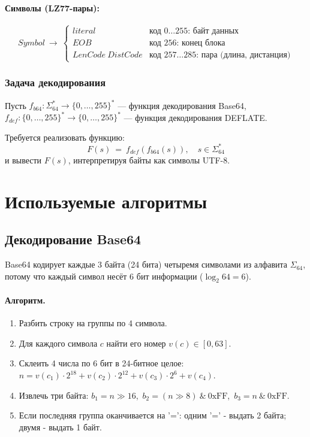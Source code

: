 \documentclass[12pt,a4paper]{article}
\begin{document}
\paragraph{Символы (LZ77-пары):}
\[
Symbol \ \to\
  \begin{cases}
    literal                   & \text{код } 0\dots255\text{: байт данных} \\
    EOB                       & \text{код } 256\text{: конец блока} \\
    LenCode\ DistCode& \text{код } 257\dots285\text{: пара (длина, дистанция)}
  \end{cases}
\]

\subsubsection{Задача декодирования}

Пусть $f_{b64}: \Sigma_{64}^* \to \{0,\dots,255\}^*$ — функция декодирования Base64,
$f_{def}: \{0,\dots,255\}^* \to \{0,\dots,255\}^*$ — функция декодирования DEFLATE.

Требуется реализовать функцию:
\[
\boxed{
  F(s) \ =\  f_{def}\!\left( f_{b64}(s) \right),
  \quad s \in \Sigma_{64}^*
}
\]
и вывести $F(s)$, интерпретируя байты как символы UTF-8.

\section{Используемые алгоритмы}

\subsection{Декодирование Base64}

Base64 кодирует каждые 3 байта (24 бита) четыремя символами из алфавита $\Sigma_{64}$, потому что каждый символ несёт 6 бит информации ($\log_2 64 = 6$).

\paragraph{Алгоритм.}
\begin{enumerate}
  \item Разбить строку на группы по 4 символа.
  \item Для каждого символа $c$ найти его номер $v(c) \in [0,63]$.
  \item Склеить 4 числа по 6 бит в 24-битное целое:
        $n = v(c_1) \cdot 2^{18} + v(c_2) \cdot 2^{12} + v(c_3) \cdot 2^6 + v(c_4)$.
  \item Извлечь три байта: $b_1 = n \gg 16$,\  $b_2 = (n \gg 8)\ \&\ \text{0xFF}$,\  $b_3 = n\ \&\ \text{0xFF}$.
  \item Если последняя группа оканчивается на '=': одним '=' - выдать 2 байта;
        двумя - выдать 1 байт.
\end{enumerate}
\end{document}
